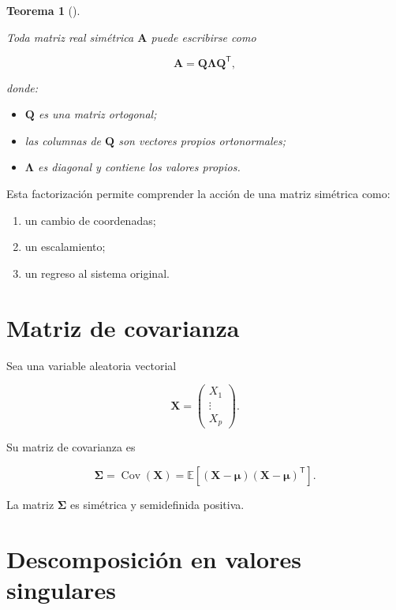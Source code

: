 \documentclass[
  spanish,
  11pt,
  letterpaper,
  DIV=11,
  numbers=noendperiod]{scrreprt}
\providecommand{\tightlist}{%
  \setlength{\itemsep}{0pt}\setlength{\parskip}{0pt}}
\theoremstyle{definition}
\theoremstyle{plain}
\newtheorem{theorem}{Teorema}[chapter]
\theoremstyle{definition}
\theoremstyle{remark}
\begin{document}
\begin{theorem}[]\protect\hypertarget{thm-descomposicion-espectral}{}\label{thm-descomposicion-espectral}

Toda matriz real simétrica \(\mathbf{A}\) puede escribirse como

\[
\mathbf{A}
=
\mathbf{Q}
\boldsymbol{\Lambda}
\mathbf{Q}^{\mathsf T},
\]

donde:

\begin{itemize}
\tightlist
\item
  \(\mathbf{Q}\) es una matriz ortogonal;
\item
  las columnas de \(\mathbf{Q}\) son vectores propios ortonormales;
\item
  \(\boldsymbol{\Lambda}\) es diagonal y contiene los valores propios.
\end{itemize}

\end{theorem}

Esta factorización permite comprender la acción de una matriz simétrica
como:

\begin{enumerate}
\def\labelenumi{\arabic{enumi}.}
\tightlist
\item
  un cambio de coordenadas;
\item
  un escalamiento;
\item
  un regreso al sistema original.
\end{enumerate}

\section{Matriz de covarianza}\label{matriz-de-covarianza}

Sea una variable aleatoria vectorial

\[
\mathbf{X}
=
\begin{pmatrix}
X_1\\
\vdots\\
X_p
\end{pmatrix}.
\]

Su matriz de covarianza es

\[
\boldsymbol{\Sigma}
=
\operatorname{Cov}(\mathbf{X})
=
\mathbb{E}
\left[
(\mathbf{X}-\boldsymbol{\mu})
(\mathbf{X}-\boldsymbol{\mu})^{\mathsf T}
\right].
\]

La matriz \(\boldsymbol{\Sigma}\) es simétrica y semidefinida positiva.

\section{Descomposición en valores
singulares}\label{descomposiciuxf3n-en-valores-singulares}
\end{document}
